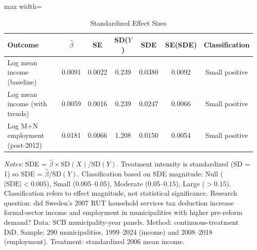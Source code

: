 \begin{table}[htbp]
\centering
\caption{Standardized Effect Sizes}
\label{tab:sde}
\begin{adjustbox}{max width=\textwidth}
\begin{tabular}{lcccccc}
\hline\hline
Outcome & $\hat{\beta}$ & SE & SD($Y$) & SDE & SE(SDE) & Classification \\
\hline
Log mean income (baseline) & 0.0091 & 0.0022 & 0.239 & 0.0380 & 0.0092 & Small positive \\
Log mean income (with trends) & 0.0059 & 0.0016 & 0.239 & 0.0247 & 0.0066 & Small positive \\
Log M+N employment (post-2012) & 0.0181 & 0.0066 & 1.208 & 0.0150 & 0.0054 & Small positive \\
\hline\hline
\end{tabular}
\end{adjustbox}
\begin{minipage}{0.95\textwidth}
\vspace{0.3em}\footnotesize
\textit{Notes:} SDE = $\hat{\beta} \times \text{SD}(X) / \text{SD}(Y)$. Treatment intensity is standardized (SD = 1) so SDE = $\hat{\beta} / \text{SD}(Y)$. Classification based on SDE magnitude: Null ($|\text{SDE}| < 0.005$), Small ($0.005$--$0.05$), Moderate ($0.05$--$0.15$), Large ($> 0.15$). Classification refers to effect magnitude, not statistical significance. Research question: did Sweden's 2007 RUT household services tax deduction increase formal-sector income and employment in municipalities with higher pre-reform demand? Data: SCB municipality-year panels. Method: continuous-treatment DiD. Sample: 290 municipalities, 1999--2024 (income) and 2008--2018 (employment). Treatment: standardized 2006 mean income.
\end{minipage}
\end{table}


